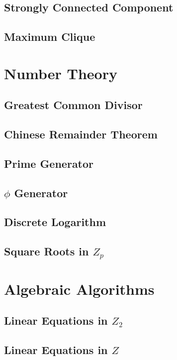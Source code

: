 \documentclass{report}
\begin{document}
\begin{CJK*}{GBK}{kai}
\section{Strongly Connected Component}

\clearpage
\section{Maximum Clique}

\clearpage

\clearpage

\chapter{Number Theory}
\section{Greatest Common Divisor}

\section{Chinese Remainder Theorem}

\clearpage
\section{Prime Generator}

\section{$\phi$ Generator}

\clearpage
\section{Discrete Logarithm}

\clearpage
\section{Square Roots in $Z_{p}$}


\chapter{Algebraic Algorithms}
\section{Linear Equations in $Z_{2}$}

\clearpage
\section{Linear Equations in $Z$}


\end{CJK*}
\end{document}
